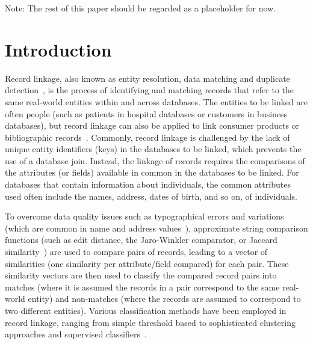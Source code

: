 \documentclass{llncs}
\begin{document}
Note: The rest of this paper should be regarded as a placeholder for now.


\section{Introduction}
\label{sec-intro}


Record linkage, also known as entity resolution, data matching and
duplicate detection~\cite{Chr12}, is the process of identifying and
matching records that refer to the same real-world entities within and
across databases. The entities to be linked are often people (such as 
patients in hospital databases or customers in business databases),
but record linkage can also be applied to link consumer products or
bibliographic records~\cite{Chr12}. Commonly, record linkage is
challenged by the lack of unique entity identifiers (keys) in the
databases to be linked, which prevents the use of a database join.
Instead, the linkage of records requires the comparisons of the
attributes (or fields) available in common in the databases to be
linked. For databases that contain information about individuals,
the common attributes used often include the names, address,
dates of birth, and so on, of individuals.

To overcome data quality issues such as typographical errors and
variations (which are common in name and address values~\cite{Chr12}),
approximate string comparison functions (such as edit distance, the
Jaro-Winkler comparator, or Jaccard similarity~\cite{Chr12}) are used
to compare pairs of records, leading to a vector of similarities (one
similarity per attribute/field compared) for each pair. These
similarity vectors are then used to classify the compared record
pairs into matches (where it is assumed the records in a pair
correspond to the same real-world entity) and non-matches (where the
records are assumed to correspond to two different entities). Various
classification methods have been employed in record linkage, ranging
from simple threshold based to sophisticated clustering approaches
and supervised classifiers~\cite{}.
\end{document}

